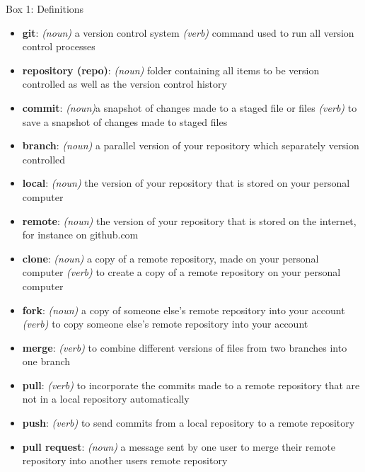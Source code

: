 Box 1: Definitions

\begin{itemize}
\item \textbf{git}: \textit{(noun)} a version control system \textit{(verb)} command used to run all version control processes
\item \textbf{repository (repo)}: \textit{(noun)} folder containing all items to be version controlled as well as the version control history
\item \textbf{commit}: \textit{(noun)}a snapshot of changes made to a staged file or files \textit{(verb)} to save a snapshot of changes made to staged files 
\item \textbf{branch}: \textit{(noun)} a parallel version of your repository which separately version controlled
\item \textbf{local}: \textit{(noun)} the version of your repository that is stored on your personal computer
\item \textbf{remote}: \textit{(noun)} the version of your repository that is stored on the internet, for instance on github.com
\item \textbf{clone}: \textit{(noun)} a copy of a remote repository, made on your personal computer \textit{(verb)} to create a copy of a remote repository on your personal computer
\item \textbf{fork}: \textit{(noun)} a copy of someone else's remote repository into your account \textit{(verb)} to copy someone else's remote repository into your account
\item \textbf{merge}: \textit{(verb)} to combine different versions of files from two branches into one branch
\item \textbf{pull}: \textit{(verb)} to incorporate the commits made to a remote repository that are not in a local repository automatically
\item \textbf{push}: \textit{(verb)} to send commits from a local repository to a remote repository
\item \textbf{pull request}: \textit{(noun)} a message sent by one user to merge their remote repository into another users remote repository
\end{itemize}